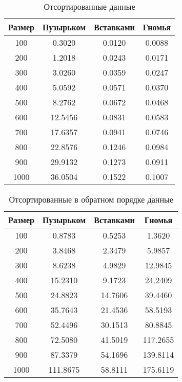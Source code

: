 \begin{table}[h]
	\begin{center}
		\begin{threeparttable}
		\captionsetup{justification=raggedright,singlelinecheck=off}
		\caption{Отсортированные данные}
		\label{tbl:best}
		\begin{tabular}{|c|c|c|c|}
			\hline
			Размер & Пузырьком &  Вставками &  Гномья \\
			\hline
			100 & 0.3020 & 0.0120 & 0.0088 \\ 
			\hline
			200 & 1.2018 & 0.0243 & 0.0171 \\ 
			\hline
			300 & 3.0260 & 0.0359 & 0.0247 \\ 
			\hline
			400 & 5.0592 & 0.0571 & 0.0370 \\ 
			\hline
			500 & 8.2762 & 0.0672 & 0.0468 \\ 
			\hline
			600 & 12.5456 & 0.0831 & 0.0583 \\ 
			\hline
			700 & 17.6357 & 0.0941 & 0.0746 \\ 
			\hline
			800 & 22.8576 & 0.1246 & 0.0984 \\ 
			\hline
			900 & 29.9132 & 0.1273 & 0.0911 \\ 
			\hline
			1000 & 36.0504 & 0.1522 & 0.1007 \\ 
			\hline
		\end{tabular}
		\end{threeparttable}
    \end{center}
\end{table}


\begin{table}[h]
	\begin{center}
		\begin{threeparttable}
		\captionsetup{justification=raggedright,singlelinecheck=off}
		\caption{Отсортированные в обратном порядке данные}
		\label{tbl:worth}
		\begin{tabular}{|c|c|c|c|}
			\hline
			Размер & Пузырьком &  Вставками &  Гномья \\
			\hline
			100 & 0.8783 & 0.5253 & 1.3620 \\ 
			\hline
			 200 & 3.8468 & 2.3479 & 5.9857 \\ 
			\hline
			 300 & 8.6238 & 4.9829 & 12.9845 \\ 
			\hline
			 400 & 15.2310 & 9.1723 & 24.2409 \\ 
			\hline
			 500 & 24.8823 & 14.7606 & 39.4460 \\ 
			\hline
			 600 & 35.7643 & 21.4536 & 58.5193 \\ 
			\hline
			 700 & 52.4496 & 30.1513 & 80.8845 \\ 
			\hline
			 800 & 72.5080 & 41.5019 & 117.2655 \\ 
			\hline
			 900 & 87.3379 & 54.1696 & 139.8114 \\ 
			\hline
			1000 & 111.8675 & 58.8111 & 175.6119 \\ 
			\hline
		\end{tabular}
		\end{threeparttable}
    \end{center}
\end{table}


